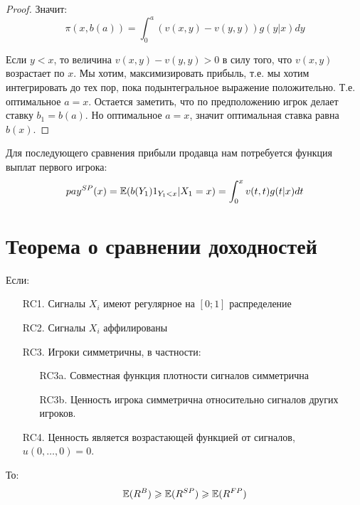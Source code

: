 \begin{itemize}
\begin{proof}
Значит:
\begin{equation}
\pi(x,b(a))=\int_{0}^{a}(v(x,y)-v(y,y)) g(y|x)dy
\end{equation}

Если $ y<x $, то величина $ v(x,y)-v(y,y)>0 $ в силу того, что $ v(x,y) $ возрастает по $ x $. Мы хотим, максимизировать прибыль, т.е. мы хотим интегрировать до тех пор, пока подынтегральное выражение положительно. Т.е. оптимальное $ a=x $. Остается заметить, что по предположению игрок делает ставку $ b_{1}=b(a) $. Но оптимальное $ a=x $, значит оптимальная ставка равна $ b(x) $.


\end{proof}


Для последующего сравнения прибыли продавца нам потребуется функция выплат первого игрока:
\begin{equation}
pay^{SP}(x)=\mathbb{E}(b(Y_{1})1_{Y_{1}<x}|X_{1}=x)=\int_{0}^{x}v(t,t)g(t|x)dt
\end{equation}





\end{itemize}



\section{Теорема о сравнении доходностей}


\begin{myth}
Если:

\begin{enumerate}
\item[RC1.] Сигналы $ X_{i} $ имеют регулярное на $ [0;1] $ распределение
\item[RC2.] Сигналы $ X_{i} $ аффилированы
\item[RC3.] Игроки симметричны, в частности:
\begin{enumerate}
\item[RC3a.] Совместная функция плотности сигналов симметрична
\item[RC3b.] Ценность игрока симметрична относительно сигналов других игроков.
\end{enumerate}
\item[RC4.] Ценность является возрастающей функцией от сигналов, $ u(0,\ldots,0)=0 $.

\end{enumerate}

То:
\begin{equation}
\mathbb{E}(R^{B})\geqslant \mathbb{E}(R^{SP})\geqslant \mathbb{E}(R^{FP})
\end{equation}

\end{myth}

